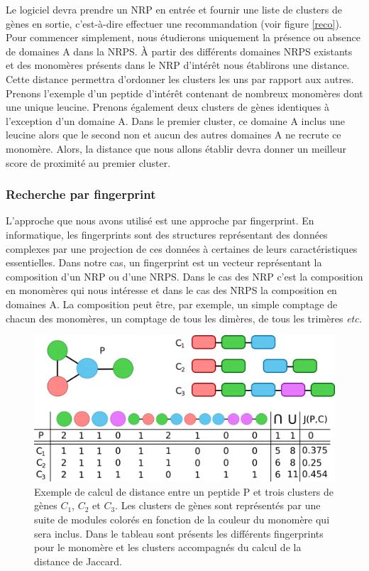 Le logiciel devra prendre un NRP en entrée et fournir une liste de clusters de gènes en sortie, c'est-à-dire effectuer une recommandation (voir figure \ref{reco}).
Pour commencer simplement, nous étudierons uniquement la présence ou absence de domaines A dans la NRPS.
À partir des différents domaines NRPS existants et des monomères présents dans le NRP d'intérêt nous établirons une distance.
Cette distance permettra d'ordonner les clusters les uns par rapport aux autres.
Prenons l'exemple d'un peptide d'intérêt contenant de nombreux monomères dont une unique leucine.
Prenons également deux clusters de gènes identiques à l'exception d'un domaine A.
Dans le premier cluster, ce domaine A inclus une leucine alors que le second non et aucun des autres domaines A ne recrute ce monomère.
Alors, la distance que nous allons établir devra donner un meilleur score de proximité au premier cluster.

\subsubsection{Recherche par fingerprint}

L'approche que nous avons utilisé est une approche par fingerprint.
En informatique, les fingerprints sont des structures représentant des données complexes par une projection de ces données à certaines de leurs caractéristiques essentielles.
Dans notre cas, un fingerprint est un vecteur représentant la composition d'un NRP ou d'une NRPS.
Dans le cas des NRP c'est la composition en monomères qui nous intéresse et dans le cas des NRPS la composition en domaines A.
La composition peut être, par exemple, un simple comptage de chacun des monomères, un comptage de tous les dimères, de tous les trimères \textit{etc.}

\begin{figure}[h!]
  \begin{center}
    \includegraphics[width=450px]{Figures/synthese/fingerprints.png}
    \caption{\label{jaccard}Exemple de calcul de distance entre un peptide P et trois clusters de gènes $C_1$, $C_2$ et $C_3$.
    Les clusters de gènes sont représentés par une suite de modules colorés en fonction de la couleur du monomère qui sera inclus.
    Dans le tableau sont présents les différents fingerprints pour le monomère et les clusters accompagnés du calcul de la distance de Jaccard.}
  \end{center}
\end{figure}

